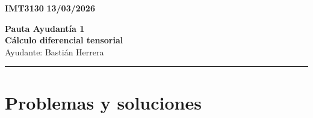 \documentclass[11pt]{article}
\begin{document}
    \begin{flushleft}
        \small
        \vspace{1pt}
        \textbf{IMT3130} \hfill
        \textbf{13/03/2026}
    \end{flushleft}
    \begin{center}
        \LARGE\textbf{Pauta Ayudantía 1}\\
        \vspace{3pt}
        \normalsize\textbf{Cálculo diferencial tensorial}\\
        \normalsize Ayudante: Bastián Herrera 
        \rule{\textwidth}{0.05mm}
    \end{center}

\section*{Problemas y soluciones}
\end{document}
